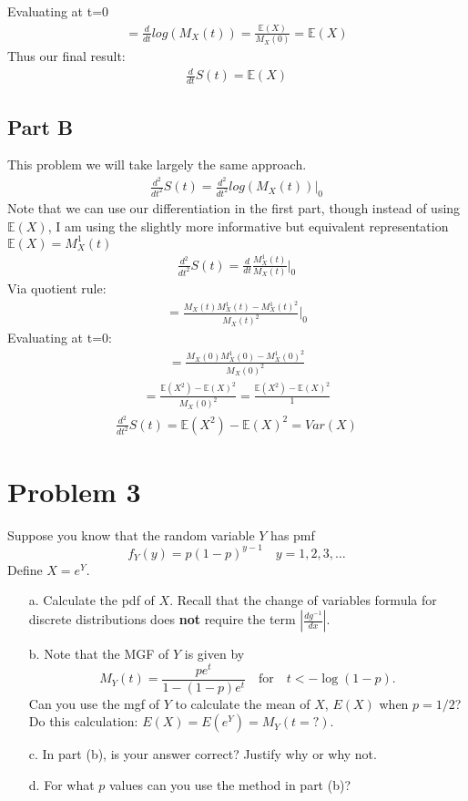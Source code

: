 \documentclass{article}
\begin{document}
Evaluating at t=0
\begin{align*}
 = \frac{d}{dt}log(M_X(t)) = \frac{\mathbb{E}(X)}{M_X(0)} = \mathbb{E}(X)
\end{align*}
Thus our final result:
\begin{align*}
 \boxed{\frac{d}{dt}S(t) = \mathbb{E}(X)}
\end{align*}
\subsection*{Part B}
This problem we will take largely the same approach.
\begin{align*}
\frac{d^2}{dt^2}S(t) = \frac{d^2}{dt^2}log(M_X(t)) |_{0} 
\end{align*}
Note that we can use our differentiation in the first part, though instead of using $\mathbb{E}(X)$, I am using the slightly more informative but equivalent representation $\mathbb{E}(X)=M_X^{1}(t)$
\begin{align*}
\frac{d^2}{dt^2}S(t) = \frac{d}{dt}\frac{M_X^{1}(t)}{M_X(t)} |_{0}
\end{align*}
Via quotient rule:
\begin{align*}
 = \frac{M_X(t)M_X^1(t)-M_X^1(t)^2}{M_X(t)^2} |_{0}
\end{align*}
Evaluating at t=0:
\begin{align*}
 = \frac{M_X(0)M_X^1(0)-M_X^1(0)^2}{M_X(0)^2} 
\end{align*}
\begin{align*}
 = \frac{\mathbb{E}(X^2)-\mathbb{E}(X)^2}{M_X(0)^2} = \frac{\mathbb{E}(X^2)-\mathbb{E}(X)^2}{1}
\end{align*}
\begin{align*}
\boxed{\frac{d^2}{dt^2}S(t) = \mathbb{E}(X^2)-\mathbb{E}(X)^2 = Var(X) }
\end{align*}
\clearpage

\section*{Problem 3}
    Suppose you know that the random variable $Y$ has pmf
    \[
    f_Y(y) = p(1-p)^{y-1} \quad y=1,2,3,\dots
    \]
    Define $X = e^Y$.

    \begin{enumerate}
    \item[a.]
      Calculate the pdf of $X$. Recall that the change of variables formula for discrete distributions does \textbf{not} require the term $\left|\frac{dg^{-1}}{dx}\right|$.
    \item[b.]
      Note that the MGF of $Y$ is given by
      \[
      M_Y(t)= \frac{pe^t}{1-(1-p)e^t} \quad \textrm{for} \quad t<-\log(1-p).
      \]
      Can you use the mgf of $Y$ to calculate the mean of $X$, $E(X)$ when $p = 1/2$? Do this calculation: $E(X) = E(e^Y) = M_Y(t=?)$.
    \item[c.]
      In part (b), is your answer correct? Justify why or why not.
    \item[d.]
      For what $p$ values can you use the method in part (b)?
    \end{enumerate}
    \clearpage
\end{document}

